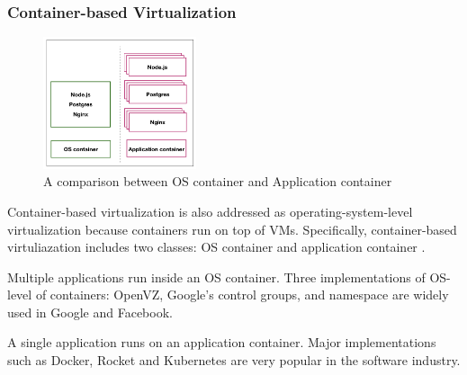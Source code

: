 
\subsubsection{Container-based Virtualization} 

\begin{figure}
	\centering
	\includegraphics[width=0.4\textwidth]{pics/container_OS_APP.png}
	\caption{A comparison between OS container and Application container \cite{Piraghaj:2017vi}}
	\label{fig:comparison_container}
\end{figure}

 Container-based virtualization is also addressed as operating-system-level virtualization because containers run on top of VMs. Specifically, container-based virtuliazation includes two classes: OS container and application container \cite{Piraghaj:2017vi}. 

Multiple applications run inside an OS container. Three implementations of OS-level of containers: OpenVZ, Google's control groups, and namespace \cite{Rosen:2013wt} are widely used in Google and Facebook.

 A single application runs on an application container. Major implementations such as Docker, Rocket and Kubernetes \cite{Bernstein:2014ur} are very popular in the software industry. 

